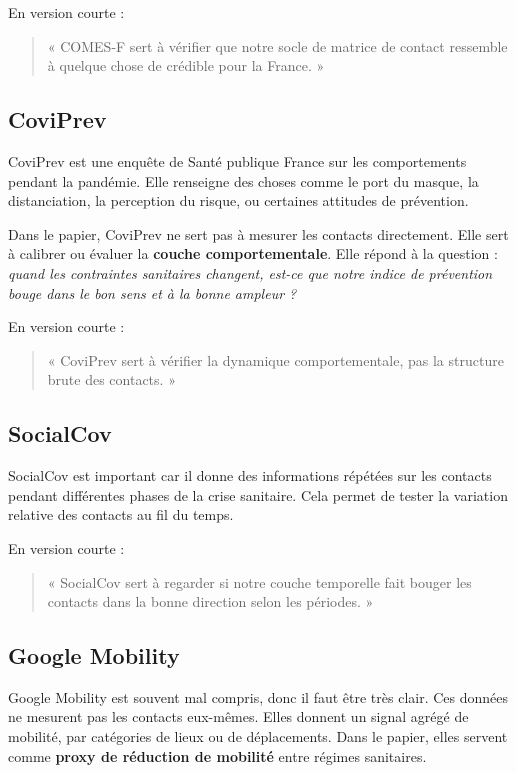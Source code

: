\documentclass[11pt,a4paper]{article}
\begin{document}
En version courte :
\begin{quote}
« COMES-F sert à vérifier que notre socle de matrice de contact ressemble à quelque chose de crédible pour la France. »
\end{quote}

\subsection*{CoviPrev}
CoviPrev est une enquête de Santé publique France sur les comportements pendant la pandémie. Elle renseigne des choses comme le port du masque, la distanciation, la perception du risque, ou certaines attitudes de prévention.

Dans le papier, CoviPrev ne sert pas à mesurer les contacts directement. Elle sert à calibrer ou évaluer la \textbf{couche comportementale}. Elle répond à la question : \emph{quand les contraintes sanitaires changent, est-ce que notre indice de prévention bouge dans le bon sens et à la bonne ampleur ?}

En version courte :
\begin{quote}
« CoviPrev sert à vérifier la dynamique comportementale, pas la structure brute des contacts. »
\end{quote}

\subsection*{SocialCov}
SocialCov est important car il donne des informations répétées sur les contacts pendant différentes phases de la crise sanitaire. Cela permet de tester la variation relative des contacts au fil du temps.

En version courte :
\begin{quote}
« SocialCov sert à regarder si notre couche temporelle fait bouger les contacts dans la bonne direction selon les périodes. »
\end{quote}

\subsection*{Google Mobility}
Google Mobility est souvent mal compris, donc il faut être très clair. Ces données ne mesurent pas les contacts eux-mêmes. Elles donnent un signal agrégé de mobilité, par catégories de lieux ou de déplacements. Dans le papier, elles servent comme \textbf{proxy de réduction de mobilité} entre régimes sanitaires.
\end{document}
